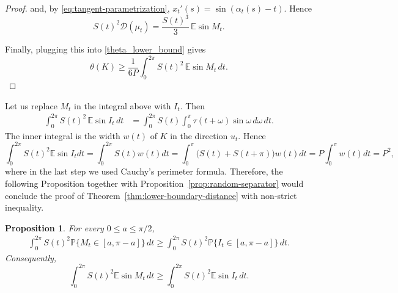 \documentclass[final,12pt]{elsarticle}
\numberwithin{equation}{section}
\newtheorem{prop}[thm]{Proposition}
\theoremstyle{remark}
\newcommand{\E}{\mathbb E}
\newcommand{\Gini}{\mathcal D}
\theoremstyle{definition}
\begin{document}
\begin{proof}
and, by \eqref{eq:tangent-parametrization}, $x_t'(s) = \sin(\alpha_t(s) - t)$.  Hence
$$    S(t)^2\Gini(\mu_t)=\frac{S(t)^3}{3}\,\mathbb E\sin M_t.$$

Finally, plugging this into \ref{theta_lower_bound} gives
\begin{equation}\label{tehta_lower_bound_fin}
\theta(K)
\ge
\frac1{6P}
\int_0^{2\pi}
S(t)^2\,\E\sin M_t\,dt.
\end{equation}
\end{proof}
Let us replace $M_t$ in the integral above with $I_t$. Then
$$
\begin{aligned}
\int_0^{2\pi}S(t)^2\,\E\sin I_t\,dt
&=
\int_0^{2\pi}
S(t)
\int_0^\pi
\tau(t+\omega)\sin \omega\,d\omega\,dt.
\end{aligned}
$$
The inner integral is the width $w(t)$ of $K$ in the direction $u_t$. Hence
\begin{equation}\label{second_brick}
\int_0^{2\pi}S(t)^2\E\sin I_tdt=\int_0^{2\pi}S(t)w(t)dt=\int_0^\pi\bigl(S(t)+S(t+\pi)\bigr)w(t)dt=P\int_0^\pi w(t)dt=P^2,
\end{equation}
where in the last step we used Cauchy's perimeter formula.
Therefore, the following Proposition together with Proposition~\ref{prop:random-separator} would conclude the proof of Theorem~\ref{thm:lower-boundary-distance} with non-strict inequality.
\begin{prop}\label{prop:median-concentration}
For every $0\le a\le\pi/2$,
\begin{equation}\label{eq:central-concentration}
\begin{aligned}
    \int_0^{2\pi}S(t)^2
       \mathbb P\{M_t\in[a,\pi-a]\}\,dt
    \ge
    \int_0^{2\pi}S(t)^2
       \mathbb P\{I_t\in[a,\pi-a]\}\,dt.
\end{aligned}
\end{equation}
Consequently,
\begin{equation}\label{eq:median-improves-sine}
    \int_0^{2\pi}S(t)^2\mathbb E\sin M_t\,dt
    \ge
    \int_0^{2\pi}S(t)^2\mathbb E\sin I_t\,dt.
\end{equation}
\end{prop}
\end{document}
